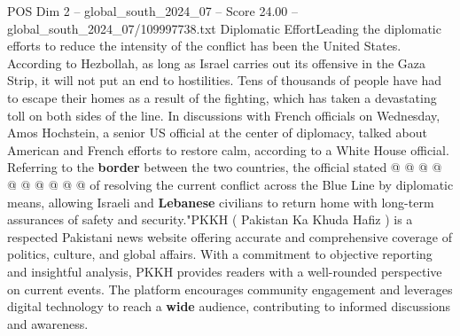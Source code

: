 \begin{textsample}{POS Dim 2 – global\_south\_2024\_07 – Score 24.00 – global\_south\_2024\_07/109997738.txt}
Diplomatic EffortLeading the diplomatic efforts to reduce the intensity of the conflict has been the United States.
According to Hezbollah, as long as Israel carries out its offensive in the Gaza Strip, it will not put an end to hostilities.
Tens of thousands of people have had to escape their homes as a result of the fighting, which has taken a devastating toll on both sides of the line.
In discussions with French officials on Wednesday, Amos Hochstein, a senior US official at the center of diplomacy, talked about American and French efforts to restore calm, according to a White House official.
Referring to the \textbf{border} between the two countries, the official stated @ @ @ @ @ @ @ @ @ @ of resolving the current conflict across the Blue Line by diplomatic means, allowing Israeli and \textbf{Lebanese} civilians to return home with long-term assurances of safety and security."PKKH ( Pakistan Ka Khuda Hafiz ) is a respected Pakistani news website offering accurate and comprehensive coverage of politics, culture, and global affairs.
With a commitment to objective reporting and insightful analysis, PKKH provides readers with a well-rounded perspective on current events.
The platform encourages community engagement and leverages digital technology to reach a \textbf{wide} audience, contributing to informed discussions and awareness.

\end{textsample}
